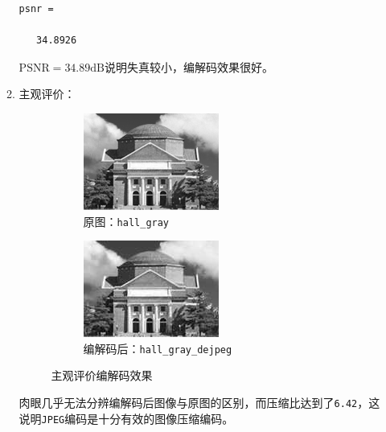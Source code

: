 \documentclass{article}
\numberwithin{figure}{section}
\numberwithin{table}{section}
\numberwithin{listing}{section}
\numberwithin{equation}{section}
\begin{document}
\begin{enumerate}
\begin{enumerate}
\begin{verbatim}
psnr =

   34.8926
                        \end{verbatim}

                        $\textrm{PSNR}=34.89\textrm{dB}$说明失真较小，编解码效果很好。

                    \item 主观评价：
                        \begin{figure}[H]
                            \centering
                            \begin{subfigure}{0.5\textwidth}
                                \centering
                                \includegraphics[width=0.6\linewidth]{hall_gray}
                                \caption{原图：\texttt{hall\_gray}}
                            \end{subfigure}%
                            \begin{subfigure}{0.5\textwidth}
                                \centering
                                \includegraphics[width=0.6\linewidth]{hall_gray_dejpeg}
                                \caption{编解码后：\texttt{hall\_gray\_dejpeg}}
                            \end{subfigure}
                            \caption{主观评价编解码效果}
                        \end{figure}

                        肉眼几乎无法分辨编解码后图像与原图的区别，而压缩比达到了\texttt{6.42}，这说明\texttt{JPEG}编码是十分有效的图像压缩编码。


\end{enumerate}
\end{enumerate}
\end{document}

